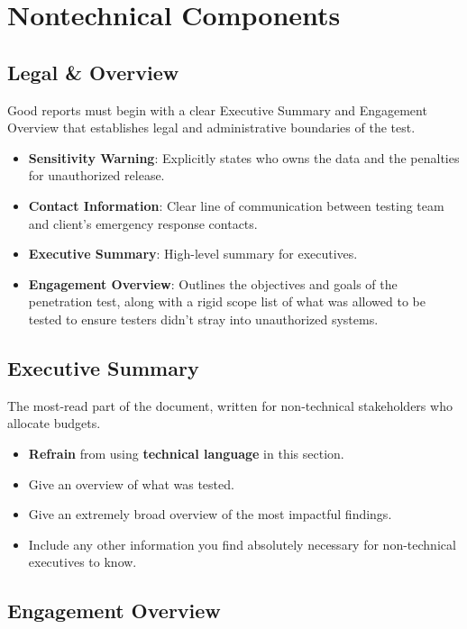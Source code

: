 \documentclass[12pt, letterpaper]{article}
\begin{document}
\section*{Nontechnical Components}

\subsection*{Legal \& Overview}

Good reports must begin with a clear Executive Summary and Engagement Overview that establishes legal and administrative boundaries of the test.

\begin{itemize}
    \item \textbf{Sensitivity Warning}: Explicitly states who owns the data and the penalties for unauthorized release.
    \item \textbf{Contact Information}: Clear line of communication between testing team and client's emergency response contacts.
    \item \textbf{Executive Summary}: High-level summary for executives.
    \item \textbf{Engagement Overview}: Outlines the objectives and goals of the penetration test, along with a rigid scope list of what was allowed to be tested to ensure testers didn't stray into unauthorized systems.
\end{itemize}

\subsection*{Executive Summary}

The most-read part of the document, written for non-technical stakeholders who allocate budgets.

\begin{itemize}
    \item \textbf{Refrain} from using \textbf{technical language} in this section.
    \item Give an overview of what was tested.
    \item Give an extremely broad overview of the most impactful findings.
    \item Include any other information you find absolutely necessary for non-technical executives to know.
\end{itemize}

\subsection*{Engagement Overview}
\end{document}
